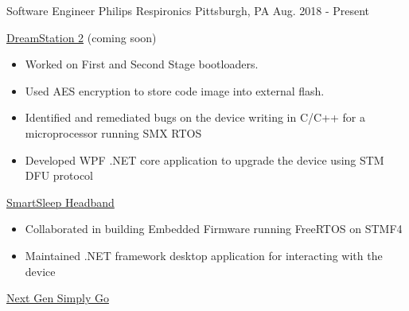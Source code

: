 


\begin{cventries}


\cventry
{Software Engineer} %
{Philips Respironics} %
{Pittsburgh, PA} %
{Aug. 2018 - Present} %
{ %
\begin{cvitems}
\item 
{
    \href{https://www.usa.philips.com/healthcare/product/HCNOCTN447/dreamstation-cpap-bi-level-therapy-systems}{\color{RoyalBlue}DreamStation 2} 
    (coming soon)
    \begin{itemize}
        \item Worked on First and Second Stage bootloaders. 
        \item Used AES encryption to store code image into external flash. 
        \item Identified and remediated bugs on the device writing in C/C++ for a microprocessor running SMX RTOS
        \item Developed WPF .NET core application to upgrade the device using STM DFU protocol
    \end{itemize} 
}
\item 
{
    \href{https://www.usa.philips.com/c-e/smartsleep/deep-sleep-headband.html}{\color{RoyalBlue}SmartSleep Headband} 
    \begin{itemize}
        \item Collaborated in building Embedded Firmware running FreeRTOS on STMF4
        \item Maintained .NET framework desktop application for interacting with the device
    \end{itemize} 
}
\item 
{
    \href{https://www.usa.philips.com/healthcare/product/HCNOCTN350/simplygo-mini-portable-oxygen-concentrator-poc}{\color{RoyalBlue}Next Gen Simply Go} 
    \begin{itemize}

\end{itemize}}
\end{cvitems}}
\end{cventries}
